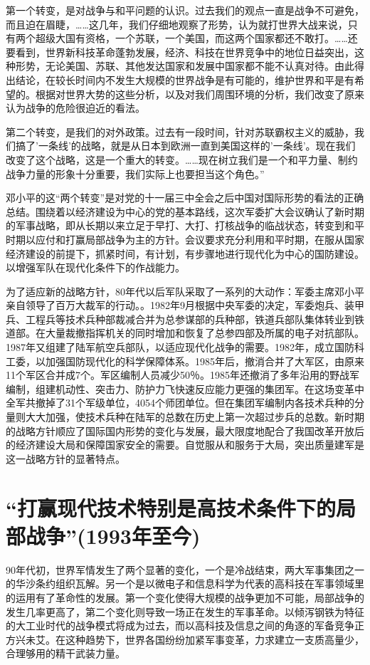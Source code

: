 \documentclass[UTF8, 12pt, a4paper]{ctexrep}
\begin{document}
第一个转变，是对战争与和平问题的认识。过去我们的观点一直是战争不可避免，而且迫在眉睫，……这几年，我们仔细地观察了形势，认为就打世界大战来说，只有两个超级大国有资格，一个苏联，一个美国，而这两个国家都还不敢打。……还要看到，世界新科技革命蓬勃发展，经济、科技在世界竞争中的地位日益突出，这种形势，无论美国、苏联、其他发达国家和发展中国家都不能不认真对待。由此得出结论，在较长时间内不发生大规模的世界战争是有可能的，维护世界和平是有希望的。根据对世界大势的这些分析，以及对我们周围环境的分析，我们改变了原来认为战争的危险很迫近的看法。

第二个转变，是我们的对外政策。过去有一段时间，针对苏联霸权主义的威胁，我们搞了'一条线'的战略，就是从日本到欧洲一直到美国这样的'一条线'。现在我们改变了这个战略，这是一个重大的转变。……现在树立我们是一个和平力量、制约战争力量的形象十分重要，我们实际上也要担当这个角色。”

邓小平的这“两个转变”是对党的十一届三中全会之后中国对国际形势的看法的正确总结。围绕着以经济建设为中心的党的基本路线，这次军委扩大会议确认了新时期的军事战略，即从长期以来立足于早打、大打、打核战争的临战状态，转变到和平时期以应付和打赢局部战争为主的方针。会议要求充分利用和平时期，在服从国家经济建设的前提下，抓紧时间，有计划，有步骤地进行现代化为中心的国防建设。以增强军队在现代化条件下的作战能力。

为了适应新的战略方针，80年代以后军队采取了一系列的大动作：军委主席邓小平亲自领导了百万大裁军的行动。。1982年9月根据中央军委的决定，军委炮兵、装甲兵、工程兵等技术兵种部裁减合并为总参谋部的兵种部，铁道兵部队集体转业到铁道部。在大量裁撤指挥机关的同时增加和恢复了总参四部及所属的电子对抗部队。1987年又组建了陆军航空兵部队，以适应现代化战争的需要。1982年，成立国防科工委，以加强国防现代化的科学保障体系。1985年后，撤消合并了大军区，由原来11个军区合并成7个。军区编制人员减少50％。1985年还撤消了多年沿用的野战军编制，组建机动性、突击力、防护力飞快速反应能力更强的集团军。在这场变革中全军共撤掉了31个军级单位，4054个师团单位。但在集团军编制内各技术兵种的分量则大大加强，使技术兵种在陆军的总数在历史上第一次超过步兵的总数。新时期的战略方针顺应了国际国内形势的变化与发展，最大限度地配合了我国改革开放后的经济建设大局和保障国家安全的需要。自觉服从和服务于大局，突出质量建军是这一战略方针的显著特点。

\section{“打赢现代技术特别是高技术条件下的局部战争”(1993年至今)}

90年代初，世界军情发生了两个显著的变化，一个是冷战结束，两大军事集团之一的华沙条约组织瓦解。另一个是以微电子和信息科学为代表的高科技在军事领域里的运用有了革命性的发展。第一个变化使得大规模的战争更加不可能，局部战争的发生几率更高了，第二个变化则导致一场正在发生的军事革命。以倾泻钢铁为特征的大工业时代的战争模式将成为过去，而以高科技及信息之间的角逐的军备竞争正方兴未艾。在这种趋势下，世界各国纷纷加紧军事变革，力求建立一支质高量少，合理够用的精干武装力量。
\end{document}
